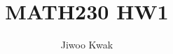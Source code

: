\documentclass[A4]{homework}
\title{MATH230 HW1}
\author{Jiwoo Kwak}
\begin{document}
\maketitle


%


\nocite{*} 
\end{document}
